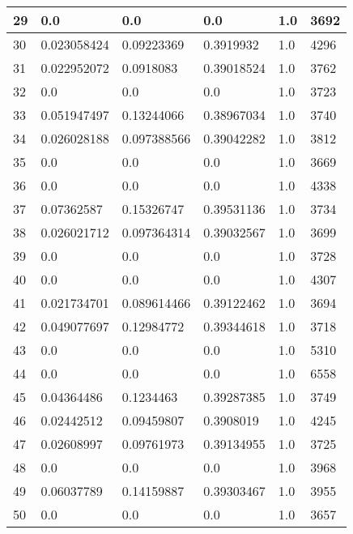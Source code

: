 \begin{longtable}{|l|l|l|l|l|l|}
29 & 0.0 & 0.0 & 0.0 & 1.0 & 3692 \\ \hline 
30 & 0.023058424 & 0.09223369 & 0.3919932 & 1.0 & 4296 \\ \hline 
31 & 0.022952072 & 0.0918083 & 0.39018524 & 1.0 & 3762 \\ \hline 
32 & 0.0 & 0.0 & 0.0 & 1.0 & 3723 \\ \hline 
33 & 0.051947497 & 0.13244066 & 0.38967034 & 1.0 & 3740 \\ \hline 
34 & 0.026028188 & 0.097388566 & 0.39042282 & 1.0 & 3812 \\ \hline 
35 & 0.0 & 0.0 & 0.0 & 1.0 & 3669 \\ \hline 
36 & 0.0 & 0.0 & 0.0 & 1.0 & 4338 \\ \hline 
37 & 0.07362587 & 0.15326747 & 0.39531136 & 1.0 & 3734 \\ \hline 
38 & 0.026021712 & 0.097364314 & 0.39032567 & 1.0 & 3699 \\ \hline 
39 & 0.0 & 0.0 & 0.0 & 1.0 & 3728 \\ \hline 
40 & 0.0 & 0.0 & 0.0 & 1.0 & 4307 \\ \hline 
41 & 0.021734701 & 0.089614466 & 0.39122462 & 1.0 & 3694 \\ \hline 
42 & 0.049077697 & 0.12984772 & 0.39344618 & 1.0 & 3718 \\ \hline 
43 & 0.0 & 0.0 & 0.0 & 1.0 & 5310 \\ \hline 
44 & 0.0 & 0.0 & 0.0 & 1.0 & 6558 \\ \hline 
45 & 0.04364486 & 0.1234463 & 0.39287385 & 1.0 & 3749 \\ \hline 
46 & 0.02442512 & 0.09459807 & 0.3908019 & 1.0 & 4245 \\ \hline 
47 & 0.02608997 & 0.09761973 & 0.39134955 & 1.0 & 3725 \\ \hline 
48 & 0.0 & 0.0 & 0.0 & 1.0 & 3968 \\ \hline 
49 & 0.06037789 & 0.14159887 & 0.39303467 & 1.0 & 3955 \\ \hline 
50 & 0.0 & 0.0 & 0.0 & 1.0 & 3657 \\ \hline 
\end{longtable}